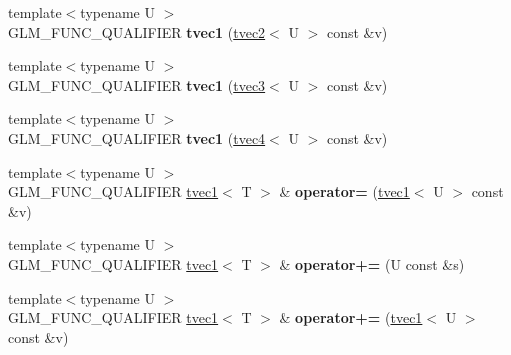 \begin{DoxyCompactItemize}
\item 
\hypertarget{structglm_1_1detail_1_1tvec1_ac11b8a6aac35361031ef478d04805d55}{}{\footnotesize template$<$typename U $>$ }\\G\+L\+M\+\_\+\+F\+U\+N\+C\+\_\+\+Q\+U\+A\+L\+I\+F\+I\+E\+R {\bfseries tvec1} (\hyperlink{structglm_1_1detail_1_1tvec2}{tvec2}$<$ U $>$ const \&v)\label{structglm_1_1detail_1_1tvec1_ac11b8a6aac35361031ef478d04805d55}

\item 
\hypertarget{structglm_1_1detail_1_1tvec1_afdf233ab9bec4b5c963af10160fae693}{}{\footnotesize template$<$typename U $>$ }\\G\+L\+M\+\_\+\+F\+U\+N\+C\+\_\+\+Q\+U\+A\+L\+I\+F\+I\+E\+R {\bfseries tvec1} (\hyperlink{structglm_1_1detail_1_1tvec3}{tvec3}$<$ U $>$ const \&v)\label{structglm_1_1detail_1_1tvec1_afdf233ab9bec4b5c963af10160fae693}

\item 
\hypertarget{structglm_1_1detail_1_1tvec1_aaacbeeddc4e1562bf2ad1c3b2a5e2ea9}{}{\footnotesize template$<$typename U $>$ }\\G\+L\+M\+\_\+\+F\+U\+N\+C\+\_\+\+Q\+U\+A\+L\+I\+F\+I\+E\+R {\bfseries tvec1} (\hyperlink{structglm_1_1detail_1_1tvec4}{tvec4}$<$ U $>$ const \&v)\label{structglm_1_1detail_1_1tvec1_aaacbeeddc4e1562bf2ad1c3b2a5e2ea9}

\item 
\hypertarget{structglm_1_1detail_1_1tvec1_a2bb1fc8cccedfe815b64d020daad98ed}{}{\footnotesize template$<$typename U $>$ }\\G\+L\+M\+\_\+\+F\+U\+N\+C\+\_\+\+Q\+U\+A\+L\+I\+F\+I\+E\+R \hyperlink{structglm_1_1detail_1_1tvec1}{tvec1}$<$ T $>$ \& {\bfseries operator=} (\hyperlink{structglm_1_1detail_1_1tvec1}{tvec1}$<$ U $>$ const \&v)\label{structglm_1_1detail_1_1tvec1_a2bb1fc8cccedfe815b64d020daad98ed}

\item 
\hypertarget{structglm_1_1detail_1_1tvec1_a425c5210b310d697e6dc7521349aa1b0}{}{\footnotesize template$<$typename U $>$ }\\G\+L\+M\+\_\+\+F\+U\+N\+C\+\_\+\+Q\+U\+A\+L\+I\+F\+I\+E\+R \hyperlink{structglm_1_1detail_1_1tvec1}{tvec1}$<$ T $>$ \& {\bfseries operator+=} (U const \&s)\label{structglm_1_1detail_1_1tvec1_a425c5210b310d697e6dc7521349aa1b0}

\item 
\hypertarget{structglm_1_1detail_1_1tvec1_a6d0687c25b53cc583ad197aa8640a6b3}{}{\footnotesize template$<$typename U $>$ }\\G\+L\+M\+\_\+\+F\+U\+N\+C\+\_\+\+Q\+U\+A\+L\+I\+F\+I\+E\+R \hyperlink{structglm_1_1detail_1_1tvec1}{tvec1}$<$ T $>$ \& {\bfseries operator+=} (\hyperlink{structglm_1_1detail_1_1tvec1}{tvec1}$<$ U $>$ const \&v)\label{structglm_1_1detail_1_1tvec1_a6d0687c25b53cc583ad197aa8640a6b3}


\end{DoxyCompactItemize}
